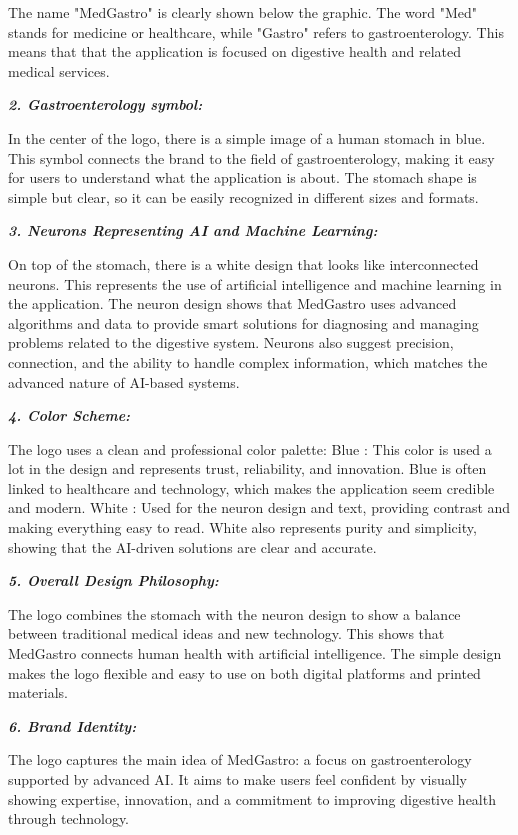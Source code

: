 \documentclass[12pt,a4paper]{report}
\begin{document}
The name "MedGastro" is clearly shown below the graphic. The word "Med" stands for medicine or healthcare, while "Gastro" refers to gastroenterology. This means that that the application is focused on digestive health and related medical services.

\textbf{\textit{2. Gastroenterology symbol:}}

In the center of the logo, there is a simple image of a human stomach in blue. This symbol connects the brand to the field of gastroenterology, making it easy for users to understand what the application is about.
The stomach shape is simple but clear, so it can be easily recognized in different sizes and formats.

\textbf{\textit{3. Neurons Representing AI and Machine Learning:}}

On top of the stomach, there is a white design that looks like interconnected neurons. This represents the use of artificial intelligence and machine learning in the application.
The neuron design shows that MedGastro uses advanced algorithms and data to provide smart solutions for diagnosing and managing problems related to the digestive system.
Neurons also suggest precision, connection, and the ability to handle complex information, which matches the advanced nature of AI-based systems.

\textit{\textbf{4. Color Scheme:}}

The logo uses a clean and professional color palette:
Blue : This color is used a lot in the design and represents trust, reliability, and innovation. Blue is often linked to healthcare and technology, which makes the application seem credible and modern.
White : Used for the neuron design and text, providing contrast and making everything easy to read. White also represents purity and simplicity, showing that the AI-driven solutions are clear and accurate.

\textbf{\textit{5. Overall Design Philosophy:}}

The logo combines the stomach with the neuron design to show a balance between traditional medical ideas and new technology. This shows that MedGastro connects human health with artificial intelligence.
The simple design makes the logo flexible and easy to use on both digital platforms and printed materials.

\textbf{\textit{6. Brand Identity:}}

The logo captures the main idea of MedGastro: a focus on gastroenterology supported by advanced AI. It aims to make users feel confident by visually showing expertise, innovation, and a commitment to improving digestive health through technology.
\end{document}
